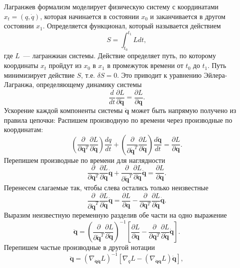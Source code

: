\documentclass[12pt, twoside]{article}
\begin{document}
Лагранжев формализм моделирует физическую систему с координатами $x_t = (q, \dot{q})$, которая начинается в состоянии $x_0$ и заканчивается в другом состоянии $x_1$. Определяется функционал, который называется действием
\begin{equation}
S=\int_{t_{0}}^{t_{1}} L d t,
\end{equation}
где $L$~--- лагранжиан системы. Действие определяет путь, по которому координаты $x_t$ пройдут из $x_0$ в $x_1$ в промежуток времени от $t_0$ до $t_1$. Путь минимизирует действие $S$, т.е. $\delta S = 0$. Это приводит к уравнению Эйлера-Лагранжа, определяющему динамику системы
\begin{equation}
\frac{d}{d t} \frac{\partial L}{\partial \dot{\mathbf{q}}}=\frac{\partial L}{\partial \mathbf{q}}.
\end{equation}
Ускорение каждой компоненты системы $ \ddot{\mathbf{q}}$ может быть напрямую получено из правила цепочки:
Распишем производную по времени через производные по координатам:
\[
\left(\frac{\partial}{\partial \mathbf{q}^T} \frac{\partial L}{\partial \dot{\mathbf{q}}} \right) \frac{d q}{d t}+\left(\frac{\partial}{\partial \dot{\mathbf{q}}^T} \frac{\partial L}{\partial \dot{\mathbf{q}}} \right)  \frac{d \dot{\mathbf{q}}}{d t}
= \frac{\partial L}{\partial \mathbf{q}}.
\]
Перепишем производные по времени для наглядности
\[
\frac{\partial}{\partial \mathbf{q}^T} \frac{\partial L}{\partial \dot{\mathbf{q}}} \dot{\mathbf{q}}+\frac{\partial}{\partial \dot{\mathbf{q}}^T} \frac{\partial L}{\partial \dot{\mathbf{q}}} \ddot{\mathbf{q}} 
= \frac{\partial L}{\partial \mathbf{q}}.
\]
Перенесем слагаемые так, чтобы слева остались только неизвестные
\[
\frac{\partial}{\partial \dot{\mathbf{q}}^T} \frac{\partial L}{\partial \dot{\mathbf{q}}} \ddot{\mathbf{q}} 
= \frac{\partial L}{\partial \mathbf{q}}-\frac{\partial}{\partial \mathbf{q}^T} \frac{\partial L}{\partial \dot{\mathbf{q}}} \dot{\mathbf{q}}.
\]
Выразим неизвестную переменную разделив обе части на одно выражение
\[
\ddot{\mathbf{q}} 
= \left(\frac{\partial}{\partial \dot{\mathbf{q}}^T} \frac{\partial L}{\partial \dot{\mathbf{q}}}\right)^{-1}\left[\frac{\partial L}{\partial \mathbf{q}}-\frac{\partial}{\partial \mathbf{q}^T} \frac{\partial L}{\partial \dot{\mathbf{q}}} \dot{\mathbf{q}}\right].
\]
Перепишем частые производные в другой нотации
\begin{equation}
\ddot{\mathbf{q}} 
= \left(\nabla_{\dot{\mathbf{q}} \dot{\mathbf{q}}} L\right)^{-1}\left[\nabla_{q} L-\left(\nabla_{\dot{\mathbf{q}}\mathbf{q}} L\right) \dot{\mathbf{q}}\right], 
\end{equation}
\end{document}
